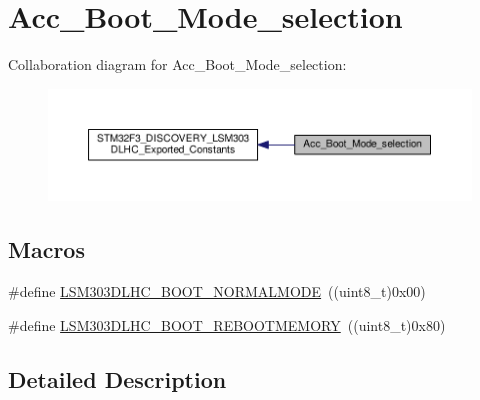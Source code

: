 \hypertarget{group__Acc__Boot__Mode__selection}{\section{Acc\+\_\+\+Boot\+\_\+\+Mode\+\_\+selection}
\label{group__Acc__Boot__Mode__selection}
}
Collaboration diagram for Acc\+\_\+\+Boot\+\_\+\+Mode\+\_\+selection\+:\nopagebreak
\begin{figure}[H]
\begin{center}
\leavevmode
\includegraphics[width=350pt]{group__Acc__Boot__Mode__selection}
\end{center}
\end{figure}
\subsection*{Macros}
\begin{DoxyCompactItemize}
\item 
\#define \hyperlink{group__Acc__Boot__Mode__selection_ga25d883d52fbb7a32d154ccd79f73b700}{L\+S\+M303\+D\+L\+H\+C\+\_\+\+B\+O\+O\+T\+\_\+\+N\+O\+R\+M\+A\+L\+M\+O\+D\+E}~((uint8\+\_\+t)0x00)
\item 
\#define \hyperlink{group__Acc__Boot__Mode__selection_ga48ac3092e5d165b3eb0a197d093df601}{L\+S\+M303\+D\+L\+H\+C\+\_\+\+B\+O\+O\+T\+\_\+\+R\+E\+B\+O\+O\+T\+M\+E\+M\+O\+R\+Y}~((uint8\+\_\+t)0x80)
\end{DoxyCompactItemize}


\subsection{Detailed Description}


